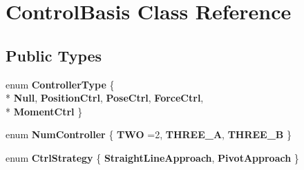 \hypertarget{classControlBasis}{\section{Control\-Basis Class Reference}
\label{classControlBasis}
}
\subsection*{Public Types}
\begin{DoxyCompactItemize}
\item 
enum {\bfseries Controller\-Type} \{ \\*
{\bfseries Null}, 
{\bfseries Position\-Ctrl}, 
{\bfseries Pose\-Ctrl}, 
{\bfseries Force\-Ctrl}, 
\\*
{\bfseries Moment\-Ctrl}
 \}
\item 
enum {\bfseries Num\-Controller} \{ {\bfseries T\-W\-O} =2, 
{\bfseries T\-H\-R\-E\-E\-\_\-\-A}, 
{\bfseries T\-H\-R\-E\-E\-\_\-\-B}
 \}
\item 
enum {\bfseries Ctrl\-Strategy} \{ {\bfseries Straight\-Line\-Approach}, 
{\bfseries Pivot\-Approach}
 \}
\end{DoxyCompactItemize}
